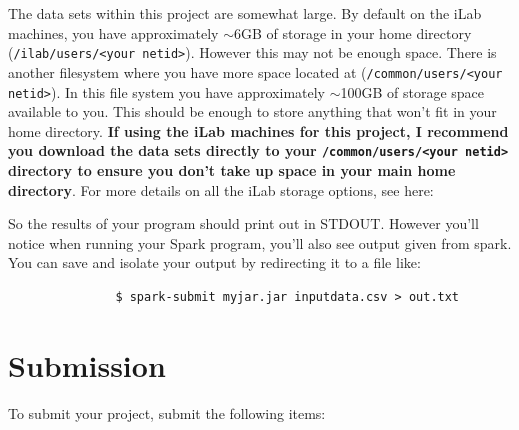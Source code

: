 \documentclass{article}
\begin{document}
\begin{info}
The data sets within this project are somewhat large. By default on the iLab machines, you have approximately $\sim$6GB of storage in your home directory (\texttt{/ilab/users/<your netid>}). However this may not be enough space. There is another filesystem where you have more space located at (\texttt{/common/users/<your netid>}). In this file system you have approximately $\sim$100GB of storage space available to you. This should be enough to store anything that won't fit in your home directory. \textbf{If using the iLab machines for this project, I recommend you download the data sets directly to your \texttt{/common/users/<your netid>} directory to ensure you don't take up space in your main home directory}. For more details on all the iLab storage options, see here: \href{https://resources.cs.rutgers.edu/docs/file-storage/storage-technology-options/}{\color{blue}{https://resources.cs.rutgers.edu/docs/file-storage/storage-technology-options/}}
\end{info}
\vspace{-0.4cm}
\begin{info}
So the results of your program should print out in STDOUT. However you'll notice when running your Spark program, you'll also see output given from spark. You can save and isolate your output by redirecting it to a file like:
\begin{verbatim}               $ spark-submit myjar.jar inputdata.csv > out.txt
\end{verbatim}


\end{info}




\section{Submission}
To submit your project, submit the following items:
\end{document}
